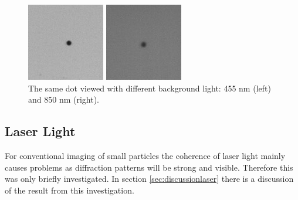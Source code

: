 \begin{figure}
\centering
\begin{minipage}{.5\textwidth}
  \centering
  \includegraphics[width=.6\linewidth]{figures/compare455nmdot}
\end{minipage}%
\begin{minipage}{.5\textwidth}
  \centering
  \includegraphics[width=.6\linewidth]{figures/compare850nmdot}
\end{minipage}
\caption{The same dot viewed with different background light: 455 nm (left) and 850 nm (right).}
\label{fig:comparedots}
\end{figure}

\subsection{Laser Light}

For conventional imaging of small particles the coherence of laser light mainly causes problems as diffraction patterns will be strong and visible. Therefore this was only briefly investigated. In section \ref{sec:discussionlaser} there is a discussion of the result from this investigation.

